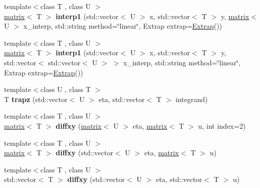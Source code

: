 \begin{DoxyCompactItemize}
\item 
\hypertarget{namespacekeycpp_ac5ab894467bbea180c9b283895d5d5d3}{{\footnotesize template$<$class T , class U $>$ }\\\hyperlink{classkeycpp_1_1matrix}{matrix}$<$ T $>$ {\bfseries interp1} (std\-::vector$<$ U $>$ x, std\-::vector$<$ T $>$ y, \hyperlink{classkeycpp_1_1matrix}{matrix}$<$ U $>$ x\-\_\-interp, std\-::string method=\char`\"{}linear\char`\"{}, Extrap extrap=\hyperlink{classkeycpp_1_1_extrap}{Extrap}())}\label{namespacekeycpp_ac5ab894467bbea180c9b283895d5d5d3}

\item 
\hypertarget{namespacekeycpp_a4c19f6ff8e0001eca5c63529bd58e664}{{\footnotesize template$<$class T , class U $>$ }\\\hyperlink{classkeycpp_1_1matrix}{matrix}$<$ T $>$ {\bfseries interp1} (std\-::vector$<$ U $>$ x, std\-::vector$<$ T $>$ y, std\-::vector$<$ std\-::vector$<$ U $>$ $>$ x\-\_\-interp, std\-::string method=\char`\"{}linear\char`\"{}, Extrap extrap=\hyperlink{classkeycpp_1_1_extrap}{Extrap}())}\label{namespacekeycpp_a4c19f6ff8e0001eca5c63529bd58e664}

\item 
\hypertarget{namespacekeycpp_ad817c482d12509f0938849890bb4de4e}{{\footnotesize template$<$class U , class T $>$ }\\T {\bfseries trapz} (std\-::vector$<$ U $>$ eta, std\-::vector$<$ T $>$ integrand)}\label{namespacekeycpp_ad817c482d12509f0938849890bb4de4e}

\item 
\hypertarget{namespacekeycpp_a379324b1d1cb219fdde96c9678aa5341}{{\footnotesize template$<$class T , class U $>$ }\\\hyperlink{classkeycpp_1_1matrix}{matrix}$<$ T $>$ {\bfseries diffxy} (\hyperlink{classkeycpp_1_1matrix}{matrix}$<$ U $>$ eta, \hyperlink{classkeycpp_1_1matrix}{matrix}$<$ T $>$ u, int index=2)}\label{namespacekeycpp_a379324b1d1cb219fdde96c9678aa5341}

\item 
\hypertarget{namespacekeycpp_a5b09f118fe12b83865ff08fe3d3633ff}{{\footnotesize template$<$class T , class U $>$ }\\\hyperlink{classkeycpp_1_1matrix}{matrix}$<$ T $>$ {\bfseries diffxy} (std\-::vector$<$ U $>$ eta, \hyperlink{classkeycpp_1_1matrix}{matrix}$<$ T $>$ u)}\label{namespacekeycpp_a5b09f118fe12b83865ff08fe3d3633ff}

\item 
\hypertarget{namespacekeycpp_a3bdbcb862d76b1b1fb5157788b7336ae}{{\footnotesize template$<$class T , class U $>$ }\\std\-::vector$<$ T $>$ {\bfseries diffxy} (std\-::vector$<$ U $>$ eta, std\-::vector$<$ T $>$ u)}\label{namespacekeycpp_a3bdbcb862d76b1b1fb5157788b7336ae}


\end{DoxyCompactItemize}

